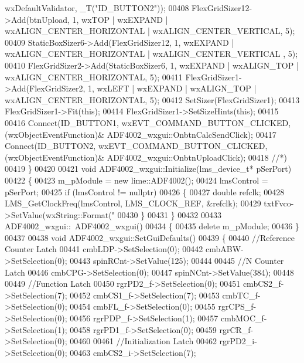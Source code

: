 \begin{DoxyCode}
      wxDefaultValidator, _T(\textcolor{stringliteral}{"ID\_BUTTON2"}));
00408     FlexGridSizer12->Add(btnUpload, 1, wxTOP | wxEXPAND | wxALIGN\_CENTER\_HORIZONTAL | 
      wxALIGN\_CENTER\_VERTICAL, 5);
00409     StaticBoxSizer6->Add(FlexGridSizer12, 1, wxEXPAND | wxALIGN\_CENTER\_HORIZONTAL | wxALIGN\_CENTER\_VERTICAL
      , 5);
00410     FlexGridSizer2->Add(StaticBoxSizer6, 1, wxEXPAND | wxALIGN\_TOP | wxALIGN\_CENTER\_HORIZONTAL, 5);
00411     FlexGridSizer1->Add(FlexGridSizer2, 1, wxLEFT | wxEXPAND | wxALIGN\_TOP | wxALIGN\_CENTER\_HORIZONTAL, 5);
00412     SetSizer(FlexGridSizer1);
00413     FlexGridSizer1->Fit(\textcolor{keyword}{this});
00414     FlexGridSizer1->SetSizeHints(\textcolor{keyword}{this});
00415 
00416     Connect(ID\_BUTTON1, wxEVT\_COMMAND\_BUTTON\_CLICKED, (wxObjectEventFunction)&
      ADF4002_wxgui::OnbtnCalcSendClick);
00417     Connect(ID\_BUTTON2, wxEVT\_COMMAND\_BUTTON\_CLICKED, (wxObjectEventFunction)&
      ADF4002_wxgui::OnbtnUploadClick);
00418     \textcolor{comment}{//*)}
00419 \}
00420 
00421 \textcolor{keywordtype}{void} ADF4002_wxgui::Initialize(lms_device_t* pSerPort)
00422 \{
00423     m\_pModule = \textcolor{keyword}{new} lime::ADF4002();
00424     lmsControl = pSerPort;
00425     \textcolor{keywordflow}{if} (lmsControl != \textcolor{keyword}{nullptr})
00426     \{
00427         \textcolor{keywordtype}{double} refclk;
00428         LMS_GetClockFreq(lmsControl, LMS_CLOCK_REF, &refclk);
00429         txtFvco->SetValue(wxString::Format(\textcolor{stringliteral}{"%
00430     \}
00431 \}
00432 
00433 ADF4002_wxgui::~ADF4002_wxgui()
00434 \{
00435     \textcolor{keyword}{delete} m\_pModule;
00436 \}
00437 
00438 \textcolor{keywordtype}{void} ADF4002_wxgui::SetGuiDefaults()
00439 \{
00440     \textcolor{comment}{//Reference Counter Latch}
00441     cmbLDP->SetSelection(0);
00442     cmbABW->SetSelection(0);
00443     spinRCnt->SetValue(125);
00444 
00445     \textcolor{comment}{//N Counter Latch}
00446     cmbCPG->SetSelection(0);
00447     spinNCnt->SetValue(384);
00448 
00449     \textcolor{comment}{//Function Latch}
00450     rgrPD2\_f->SetSelection(0);
00451     cmbCS2\_f->SetSelection(7);
00452     cmbCS1\_f->SetSelection(7);
00453     cmbTC\_f->SetSelection(0);
00454     cmbFL\_f->SetSelection(0);
00455     rgrCPS\_f->SetSelection(0);
00456     rgrPDP\_f->SetSelection(1);
00457     cmbMOC\_f->SetSelection(1);
00458     rgrPD1\_f->SetSelection(0);
00459     rgrCR\_f->SetSelection(0);
00460 
00461     \textcolor{comment}{//Initialization Latch}
00462     rgrPD2\_i->SetSelection(0);
00463     cmbCS2\_i->SetSelection(7);
}
\end{DoxyCode}
